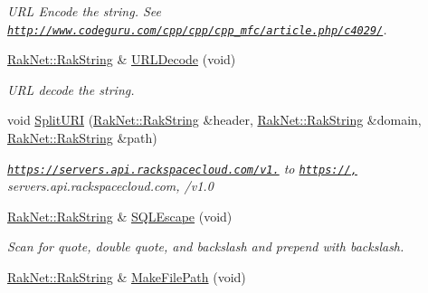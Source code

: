 \begin{DoxyCompactItemize}
\begin{DoxyCompactList}\small\item\em U\-R\-L Encode the string. See \href{http://www.codeguru.com/cpp/cpp/cpp_mfc/article.php/c4029/}{\tt http\-://www.\-codeguru.\-com/cpp/cpp/cpp\-\_\-mfc/article.\-php/c4029/}. \end{DoxyCompactList}\item 
\hypertarget{class_rak_net_1_1_rak_string_a665ee6e312ae9770d96732ea7eac8222}{\hyperlink{class_rak_net_1_1_rak_string}{Rak\-Net\-::\-Rak\-String} \& \hyperlink{class_rak_net_1_1_rak_string_a665ee6e312ae9770d96732ea7eac8222}{U\-R\-L\-Decode} (void)}\label{class_rak_net_1_1_rak_string_a665ee6e312ae9770d96732ea7eac8222}

\begin{DoxyCompactList}\small\item\em U\-R\-L decode the string. \end{DoxyCompactList}\item 
\hypertarget{class_rak_net_1_1_rak_string_a4820da2e2eb987863120cccfcf701547}{void \hyperlink{class_rak_net_1_1_rak_string_a4820da2e2eb987863120cccfcf701547}{Split\-U\-R\-I} (\hyperlink{class_rak_net_1_1_rak_string}{Rak\-Net\-::\-Rak\-String} \&header, \hyperlink{class_rak_net_1_1_rak_string}{Rak\-Net\-::\-Rak\-String} \&domain, \hyperlink{class_rak_net_1_1_rak_string}{Rak\-Net\-::\-Rak\-String} \&path)}\label{class_rak_net_1_1_rak_string_a4820da2e2eb987863120cccfcf701547}

\begin{DoxyCompactList}\small\item\em \href{https://servers.api.rackspacecloud.com/v1.0}{\tt https\-://servers.\-api.\-rackspacecloud.\-com/v1.} to \href{https://,}{\tt https\-://,} servers.\-api.\-rackspacecloud.\-com, /v1.0 \end{DoxyCompactList}\item 
\hypertarget{class_rak_net_1_1_rak_string_a6932a1a6069d3c017b3ed7389a8262bd}{\hyperlink{class_rak_net_1_1_rak_string}{Rak\-Net\-::\-Rak\-String} \& \hyperlink{class_rak_net_1_1_rak_string_a6932a1a6069d3c017b3ed7389a8262bd}{S\-Q\-L\-Escape} (void)}\label{class_rak_net_1_1_rak_string_a6932a1a6069d3c017b3ed7389a8262bd}

\begin{DoxyCompactList}\small\item\em Scan for quote, double quote, and backslash and prepend with backslash. \end{DoxyCompactList}\item 
\hypertarget{class_rak_net_1_1_rak_string_a5a8f252381a344093ea45ee62fd98d2f}{\hyperlink{class_rak_net_1_1_rak_string}{Rak\-Net\-::\-Rak\-String} \& \hyperlink{class_rak_net_1_1_rak_string_a5a8f252381a344093ea45ee62fd98d2f}{Make\-File\-Path} (void)}\label{class_rak_net_1_1_rak_string_a5a8f252381a344093ea45ee62fd98d2f}


\end{DoxyCompactItemize}
